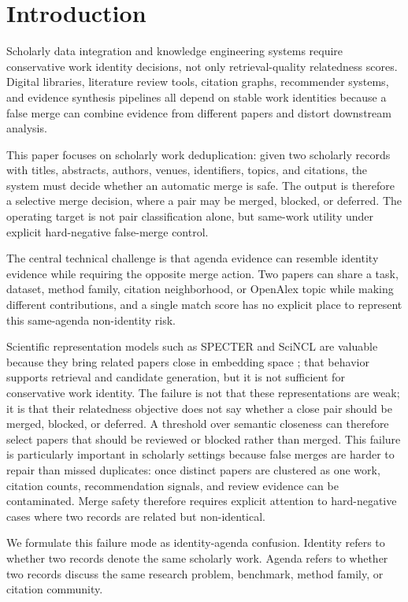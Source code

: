 \documentclass[preprint,12pt]{elsarticle}
\begin{document}
\section{Introduction}

Scholarly data integration and knowledge engineering systems require conservative work identity decisions, not only retrieval-quality relatedness scores. Digital libraries, literature review tools, citation graphs, recommender systems, and evidence synthesis pipelines all depend on stable work identities because a false merge can combine evidence from different papers and distort downstream analysis.

This paper focuses on scholarly work deduplication: given two scholarly records with titles, abstracts, authors, venues, identifiers, topics, and citations, the system must decide whether an automatic merge is safe. The output is therefore a selective merge decision, where a pair may be merged, blocked, or deferred. The operating target is not pair classification alone, but same-work utility under explicit hard-negative false-merge control.

The central technical challenge is that agenda evidence can resemble identity evidence while requiring the opposite merge action. Two papers can share a task, dataset, method family, citation neighborhood, or OpenAlex topic while making different contributions, and a single match score has no explicit place to represent this same-agenda non-identity risk.

Scientific representation models such as SPECTER and SciNCL are valuable because they bring related papers close in embedding space \citep{cohan2020specter,ostendorff2022scincl}; that behavior supports retrieval and candidate generation, but it is not sufficient for conservative work identity. The failure is not that these representations are weak; it is that their relatedness objective does not say whether a close pair should be merged, blocked, or deferred. A threshold over semantic closeness can therefore select papers that should be reviewed or blocked rather than merged. This failure is particularly important in scholarly settings because false merges are harder to repair than missed duplicates: once distinct papers are clustered as one work, citation counts, recommendation signals, and review evidence can be contaminated. Merge safety therefore requires explicit attention to hard-negative cases where two records are related but non-identical.

We formulate this failure mode as identity-agenda confusion. Identity refers to whether two records denote the same scholarly work. Agenda refers to whether two records discuss the same research problem, benchmark, method family, or citation community.
\end{document}
